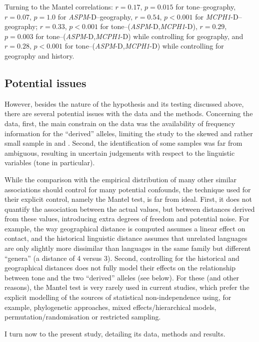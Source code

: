 \documentclass[twoside,twocolumn]{article}
\begin{document}
Turning to the Mantel correlations: $r = 0.17$, $p = 0.015$ for tone--geography, $r = 0.07$, $p = 1.0$ for \textit{ASPM}-D--geography, $r = 0.54$, $p < 0.001$ for \textit{MCPH1}-D--geography; $r = 0.33$, $p < 0.001$ for tone--(\textit{ASPM}-D,\textit{MCPH1}-D), $r = 0.29$, $p = 0.003$ for tone--(\textit{ASPM}-D,\textit{MCPH1}-D) while controlling for geography, and $r = 0.28$, $p < 0.001$ for tone--(\textit{ASPM}-D,\textit{MCPH1}-D) while controlling for geography and history.

\subsection{Potential issues}

However, besides the nature of the hypothesis and its testing discussed above, there are several potential issues with the data and the methods.
Concerning the data, first, the main constrain on the data was the availability of frequency information for the ``derived'' alleles, limiting the study to the skewed and rather small sample in \citet{evans_microcephalin_2005} and \citet{mekelbobrov_aspm_2005}.
Second, the identification of some samples was far from ambiguous, resulting in uncertain judgements with respect to the linguistic variables (tone in particular).

While the comparison with the empirical distribution of many other similar associations should control for many potential confounds, the technique used for their explicit control, namely the Mantel test, is far from ideal.
First, it does not quantify the association between the actual values, but between distances derived from these values, introducing extra degrees of freedom and potential noise.
For example, the way geographical distance is computed assumes a linear effect on contact, and the historical linguistic distance assumes that unrelated languages are only slightly more dissimilar than languages in the same family but different ``genera'' (a distance of 4 versus 3).
Second, controlling for the historical and geographical distances does not fully model their effects on the relationship between tone and the two ``derived'' alleles (see below).
For these (and other reasons), the Mantel test is very rarely used in current studies, which prefer the explicit modelling of the sources of statistical non-independence using, for example, phylogenetic approaches, mixed effects/hierarchical models, permutation/randomisation or restricted sampling.

I turn now to the present study, detailing its data, methods and results.
\end{document}
